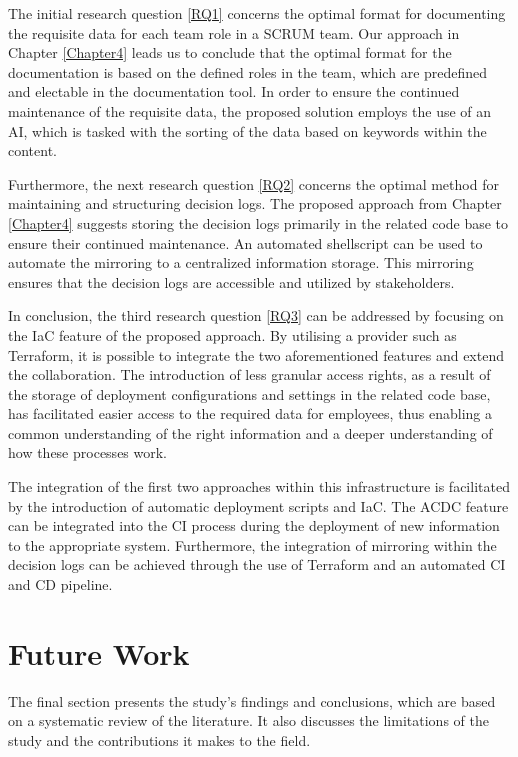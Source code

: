 The initial research question \ref{RQ1} concerns the optimal format for documenting the requisite data for each team role in a \ac{SCRUM} team. Our approach in Chapter \ref{Chapter4} leads us to conclude that the optimal format for the documentation is based on the defined roles in the team, which are predefined and electable in the documentation tool. In order to ensure the continued maintenance of the requisite data, the proposed solution employs the use of an \ac{AI}, which is tasked with the sorting of the data based on keywords within the content.

Furthermore, the next research question \ref{RQ2} concerns the optimal method for maintaining and structuring decision logs. The proposed approach from Chapter \ref{Chapter4} suggests storing the decision logs primarily in the related code base to ensure their continued maintenance. An automated shellscript can be used to automate the mirroring to a centralized information storage. This mirroring ensures that the decision logs are accessible and utilized by stakeholders.

In conclusion, the third research question \ref{RQ3} can be addressed by focusing on the \ac{IaC} feature of the proposed approach. By utilising a provider such as Terraform, it is possible to integrate the two aforementioned features and extend the collaboration. The introduction of less granular access rights, as a result of the storage of deployment configurations and settings in the related code base, has facilitated easier access to the required data for employees, thus enabling a common understanding of the right information and a deeper understanding of how these processes work.

The integration of the first two approaches within this infrastructure is facilitated by the introduction of automatic deployment scripts and \ac{IaC}. The \ac{ACDC} feature can be integrated into the \ac{CI} process during the deployment of new information to the appropriate system. Furthermore, the integration of mirroring within the decision logs can be achieved through the use of Terraform and an automated \ac{CI} and \ac{CD} pipeline.

\section{Future Work}
The final section presents the study's findings and conclusions, which are based on a systematic review of the literature. It also discusses the limitations of the study and the contributions it makes to the field.

